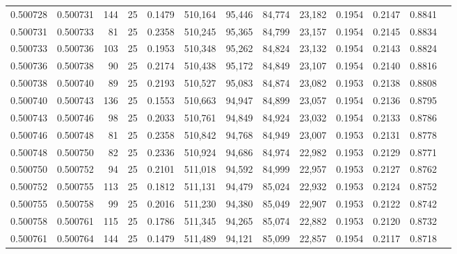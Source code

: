 \begin{tabular}{rrrrrrrrrrrrr}
0.500728 & 0.500731 & 144 &  25 &                                     0.1479 & 510,164 &  95,446 &  84,774 &  23,182 & 0.1954 & 0.2147 & 0.8841 \\
0.500731 & 0.500733 &  81 &  25 &                                     0.2358 & 510,245 &  95,365 &  84,799 &  23,157 & 0.1954 & 0.2145 & 0.8834 \\
0.500733 & 0.500736 & 103 &  25 &                                     0.1953 & 510,348 &  95,262 &  84,824 &  23,132 & 0.1954 & 0.2143 & 0.8824 \\
0.500736 & 0.500738 &  90 &  25 &                                     0.2174 & 510,438 &  95,172 &  84,849 &  23,107 & 0.1954 & 0.2140 & 0.8816 \\
0.500738 & 0.500740 &  89 &  25 &                                     0.2193 & 510,527 &  95,083 &  84,874 &  23,082 & 0.1953 & 0.2138 & 0.8808 \\
0.500740 & 0.500743 & 136 &  25 &                                     0.1553 & 510,663 &  94,947 &  84,899 &  23,057 & 0.1954 & 0.2136 & 0.8795 \\
0.500743 & 0.500746 &  98 &  25 &                                     0.2033 & 510,761 &  94,849 &  84,924 &  23,032 & 0.1954 & 0.2133 & 0.8786 \\
0.500746 & 0.500748 &  81 &  25 &                                     0.2358 & 510,842 &  94,768 &  84,949 &  23,007 & 0.1953 & 0.2131 & 0.8778 \\
0.500748 & 0.500750 &  82 &  25 &                                     0.2336 & 510,924 &  94,686 &  84,974 &  22,982 & 0.1953 & 0.2129 & 0.8771 \\
0.500750 & 0.500752 &  94 &  25 &                                     0.2101 & 511,018 &  94,592 &  84,999 &  22,957 & 0.1953 & 0.2127 & 0.8762 \\
0.500752 & 0.500755 & 113 &  25 &                                     0.1812 & 511,131 &  94,479 &  85,024 &  22,932 & 0.1953 & 0.2124 & 0.8752 \\
0.500755 & 0.500758 &  99 &  25 &                                     0.2016 & 511,230 &  94,380 &  85,049 &  22,907 & 0.1953 & 0.2122 & 0.8742 \\
0.500758 & 0.500761 & 115 &  25 &                                     0.1786 & 511,345 &  94,265 &  85,074 &  22,882 & 0.1953 & 0.2120 & 0.8732 \\
0.500761 & 0.500764 & 144 &  25 &                                     0.1479 & 511,489 &  94,121 &  85,099 &  22,857 & 0.1954 & 0.2117 & 0.8718 \\

\end{tabular}
